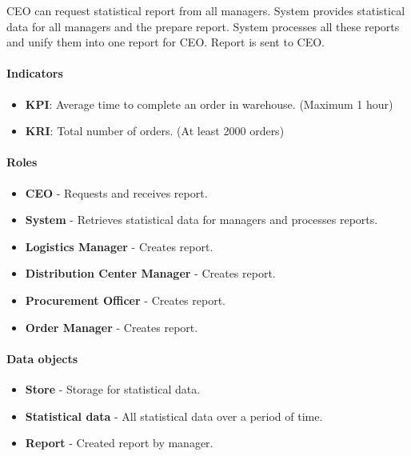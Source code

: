 \documentclass[11pt,a4paper]{article}
\begin{document}
CEO can request statistical report from all managers. System provides statistical data for all managers and the prepare report. System processes all these reports and unify them into one report for CEO. Report is sent to CEO.

\paragraph{Indicators}

\begin{itemize}
    \item \textbf{KPI}: Average time to complete an order in warehouse. (Maximum 1 hour)
    \item \textbf{KRI}: Total number of orders. (At least 2000 orders)
\end{itemize}

\paragraph{Roles}

\begin{itemize}
    \item \textbf{CEO} - Requests and receives report.
    \item \textbf{System} - Retrieves statistical data for managers and processes reports.
    \item \textbf{Logistics Manager} - Creates report.
    \item \textbf{Distribution Center Manager} - Creates report.
    \item \textbf{Procurement Officer} - Creates report.
    \item \textbf{Order Manager} - Creates report.
\end{itemize}

\paragraph{Data objects}

\begin{itemize}
    \item \textbf{Store} - Storage for statistical data.
    \item \textbf{Statistical data} - All statistical data over a period of time.
    \item \textbf{Report} - Created report by manager.
\end{itemize}

\newpage
\end{document}
